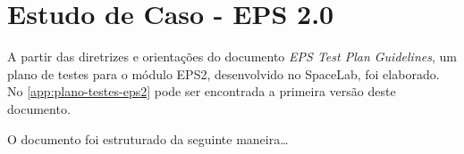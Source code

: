 \chapter{Estudo de Caso - EPS 2.0}

A partir das diretrizes e orientações do documento \textit{EPS Test Plan Guidelines}, um plano de testes para o módulo \gls{EPS2}, desenvolvido no SpaceLab, foi elaborado.
No \autoref{app:plano-testes-eps2} pode ser encontrada a primeira versão deste documento.

O documento foi estruturado da seguinte maneira\dots